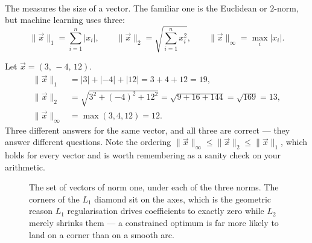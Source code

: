 The  measures the size of a vector. The familiar one is the
Euclidean or $2$-norm\textsuperscript{\cite[][p.~90]{cherneyLinearAlgebra2013}},
but machine learning uses three:
\begin{equation}
  \lVert \vec{x}\rVert_1 = \sum_{i=1}^{n}\lvert x_i\rvert,
  \qquad
  \lVert \vec{x}\rVert_2 = \sqrt{\sum_{i=1}^{n} x_i^2},
  \qquad
  \lVert \vec{x}\rVert_\infty = \max_i \lvert x_i\rvert .
  \label{eq:math-norms}
\end{equation}

\begin{workedexample}
Let $\vec{x} = (3,\,-4,\,12)$.
\[
\begin{aligned}
  \lVert\vec{x}\rVert_1 &= \lvert3\rvert+\lvert-4\rvert+\lvert12\rvert
    = 3+4+12 = 19,\\
  \lVert\vec{x}\rVert_2 &= \sqrt{3^2+(-4)^2+12^2}
    = \sqrt{9+16+144} = \sqrt{169} = 13,\\
  \lVert\vec{x}\rVert_\infty &= \max(3,4,12) = 12 .
\end{aligned}
\]
Three different answers for the same vector, and all three are correct --- they
answer different questions. Note the ordering
$\lVert\vec{x}\rVert_\infty \le \lVert\vec{x}\rVert_2 \le
\lVert\vec{x}\rVert_1$, which holds for every vector and is worth remembering
as a sanity check on your arithmetic.
\end{workedexample}

\begin{figure}[htbp]
\centering
{}
\caption{The set of vectors of norm one, under each of the three norms. The
corners of the $L_1$ diamond sit on the axes, which is the geometric reason
$L_1$ regularisation drives coefficients to exactly zero while $L_2$ merely
shrinks them --- a constrained optimum is far more likely to land on a corner
than on a smooth arc.}
\label{fig:math-unit-balls}
\end{figure}

